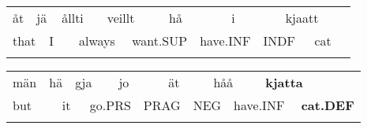 \begin{tabular}{lllllllllllllll}
\lsptoprule
åt & \multicolumn{2}{l}{jä

} & \multicolumn{2}{l}{ållti

} & \multicolumn{2}{l}{veillt

} & \multicolumn{2}{l}{hå

} & \multicolumn{2}{l}{i

} & \multicolumn{2}{l}{kjaatt

} & \multicolumn{2}{l}{}\\
\multicolumn{2}{l}{that

} & \multicolumn{2}{l}{I

} & \multicolumn{2}{l}{always

} & \multicolumn{2}{l}{want.SUP

} & \multicolumn{2}{l}{have.INF

} & \multicolumn{2}{l}{INDF

} & \multicolumn{2}{l}{cat

} & \\
\lspbottomrule
\end{tabular}

\begin{tabular}{llllllllllllll}
\lsptoprule
män & \multicolumn{2}{l}{hä

} & \multicolumn{2}{l}{gja

} & \multicolumn{2}{l}{jo

} & \multicolumn{2}{l}{ät

} & \multicolumn{2}{l}{håå

} & \multicolumn{2}{l}{{\bfseries kjatta}

} & \\
\multicolumn{2}{l}{but

} & \multicolumn{2}{l}{it

} & \multicolumn{2}{l}{go.PRS

} & \multicolumn{2}{l}{PRAG

} & \multicolumn{2}{l}{NEG

} & \multicolumn{2}{l}{have.INF

} & \multicolumn{2}{l}{{\bfseries cat.DEF}

}\\
\lspbottomrule
\end{tabular}

